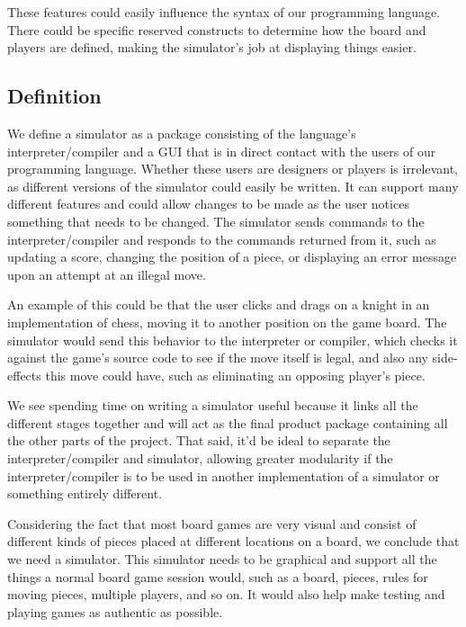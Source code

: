 These features could easily influence the syntax of our programming language. There could be specific reserved constructs to determine how the board and players are defined, making the simulator's job at displaying things easier.

\subsection{Definition}
We define a simulator as a package consisting of the language's interpreter/compiler and a GUI that is in direct contact with the users of our programming language. Whether these users are designers or players is irrelevant, as different versions of the simulator could easily be written. It can support many different features and could allow changes to be made as the user notices something that needs to be changed. The simulator sends commands to the interpreter/compiler and responds to the commands returned from it, such as updating a score, changing the position of a piece, or displaying an error message upon an attempt at an illegal move.

An example of this could be that the user clicks and drags on a knight in an implementation of chess, moving it to another position on the game board. The simulator would send this behavior to the interpreter or compiler, which checks it against the game's source code to see if the move itself is legal, and also any side-effects this move could have, such as eliminating an opposing player's piece.

We see spending time on writing a simulator useful because it links all the different stages together and will act as the final product package containing all the other parts of the project. That said, it'd be ideal to separate the interpreter/compiler and simulator, allowing greater modularity if the interpreter/compiler is to be used in another implementation of a simulator or something entirely different. 

Considering the fact that most board games are very visual and consist of different kinds of pieces placed at different locations on a board, we conclude that we need a simulator. This simulator needs to be graphical and support all the things a normal board game session would, such as a board, pieces, rules for moving pieces, multiple players, and so on. It would also help make testing and playing games as authentic as possible.
